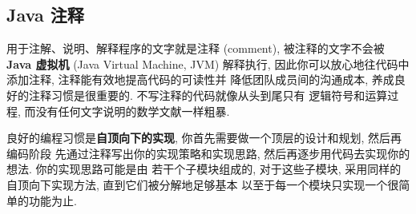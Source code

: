 \documentclass[10pt,UTF8]{book} %
\begin{document}
\subsection{Java 注释}

用于注解、说明、解释程序的文字就是注释 (comment), 
被注释的文字不会被 \textbf{Java 虚拟机} (Java Virtual Machine, JVM) 解释执行,
因此你可以放心地往代码中添加注释,
注释能有效地提高代码的可读性并
降低团队成员间的沟通成本, 养成良好的注释习惯是很重要的. 不写注释的代码就像从头到尾只有
逻辑符号和运算过程, 而没有任何文字说明的数学文献一样粗暴.

良好的编程习惯是\textbf{自顶向下的实现}, 你首先需要做一个顶层的设计和规划, 然后再编码阶段
先通过注释写出你的实现策略和实现思路, 然后再逐步用代码去实现你的想法. 你的实现思路可能是由
若干个子模块组成的, 对于这些子模块, 采用同样的自顶向下实现方法, 直到它们被分解地足够基本
以至于每一个模块只实现一个很简单的功能为止.
\end{document}
